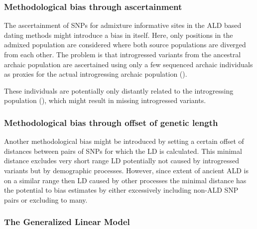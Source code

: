 \documentclass[]{article}
\begin{document}
\subsubsection{Methodological bias through
ascertainment}\label{methodological-bias-through-ascertainment}

The ascertainment of SNPs for admixture informative sites in the ALD
based dating methods might introduce a bias in itself. Here, only
positions in the admixed population are considered where both source
populations are diverged from each other. The problem is that
introgressed variants from the ancestral archaic population are
ascertained using only a few sequenced archaic individuals as proxies
for the actual introgressing archaic population
(\cite{sankararaman_date_2012,fu_genome_2014,sankararaman_combined_2016,moorjani_genetic_2016}).

These individuals are potentially only distantly related to the
introgressing population (\cite{jacobs_multiple_2019}), which might
result in missing introgressed variants.

\subsubsection{Methodological bias through offset of genetic length}\label{methodological bias through offset of genetic length}

Another methodological bias might be introduced by setting a certain offset of distances between pairs of SNPs for which the LD is calculated. This minimal distance excludes very short range LD potentially not caused by introgressed variants but by demographic processes. However, since extent of ancient ALD is on a similar range then LD caused by other processes the minimal distance has the potential to bias estimates by either excessively including non-ALD SNP pairs or excluding to many.

\subsubsection{The Generalized Linear Model}\label{the generalized linear model}
\end{document}
